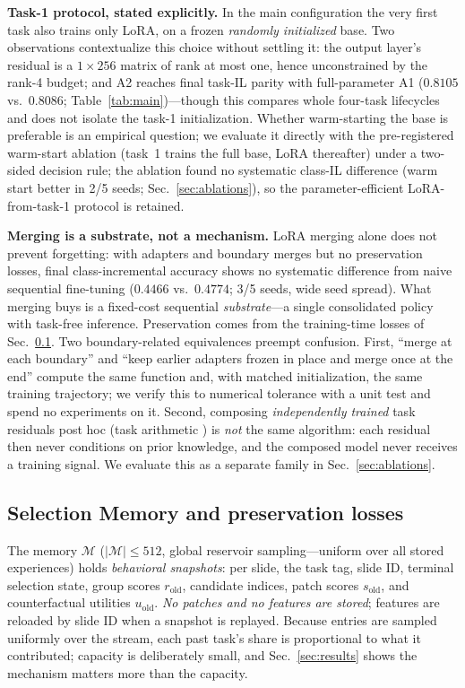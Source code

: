 \documentclass{article}
\begin{document}
\textbf{Task-1 protocol, stated explicitly.} In the main configuration the very first task also trains only LoRA, on a frozen \emph{randomly initialized} base. Two observations contextualize this choice without settling it: the output layer's residual is a $1{\times}256$ matrix of rank at most one, hence unconstrained by the rank-4 budget; and A2 reaches final task-IL parity with full-parameter A1 ($0.8105$ vs.\ $0.8086$; Table~\ref{tab:main})---though this compares whole four-task lifecycles and does not isolate the task-1 initialization. Whether warm-starting the base is preferable is an empirical question; we evaluate it directly with the pre-registered warm-start ablation (task~1 trains the full base, LoRA thereafter) under a two-sided decision rule; the ablation found no systematic class-IL difference (warm start better in 2/5 seeds; Sec.~\ref{sec:ablations}), so the parameter-efficient LoRA-from-task-1 protocol is retained.

\textbf{Merging is a substrate, not a mechanism.} LoRA merging alone does not prevent forgetting: with adapters and boundary merges but no preservation losses, final class-incremental accuracy shows no systematic difference from naive sequential fine-tuning ($0.4466$ vs.\ $0.4774$; 3/5 seeds, wide seed spread). What merging buys is a fixed-cost sequential \emph{substrate}---a single consolidated policy with task-free inference. Preservation comes from the training-time losses of Sec.~\ref{ssec:mem}. Two boundary-related equivalences preempt confusion. First, ``merge at each boundary'' and ``keep earlier adapters frozen in place and merge once at the end'' compute the same function and, with matched initialization, the same training trajectory; we verify this to numerical tolerance with a unit test and spend no experiments on it. Second, composing \emph{independently trained} task residuals post hoc (task arithmetic \cite{ilharco2023task}) is \emph{not} the same algorithm: each residual then never conditions on prior knowledge, and the composed model never receives a training signal. We evaluate this as a separate family in Sec.~\ref{sec:ablations}.

\subsection{Selection Memory and preservation losses}
\label{ssec:mem}
The memory $\mathcal{M}$ ($|\mathcal{M}|\le 512$, global reservoir sampling---uniform over all stored experiences) holds \emph{behavioral snapshots}: per slide, the task tag, slide ID, terminal selection state, group scores $r_{\mathrm{old}}$, candidate indices, patch scores $s_{\mathrm{old}}$, and counterfactual utilities $u_{\mathrm{old}}$. \emph{No patches and no features are stored}; features are reloaded by slide ID when a snapshot is replayed. Because entries are sampled uniformly over the stream, each past task's share is proportional to what it contributed; capacity is deliberately small, and Sec.~\ref{sec:results} shows the mechanism matters more than the capacity.
\end{document}

